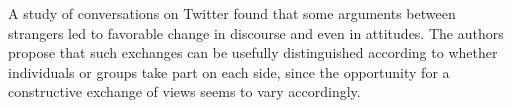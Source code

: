 A study of conversations on Twitter found that some arguments between strangers led to favorable change in discourse and even in attitudes. The authors propose that such exchanges can be usefully distinguished according to whether individuals or groups take part on each side, since the opportunity for a constructive exchange of views seems to vary accordingly.
